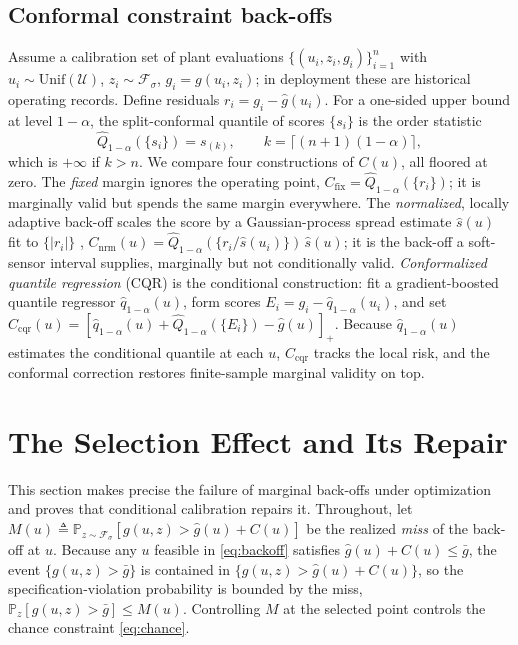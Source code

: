 \documentclass[journal]{IEEEtran}
\begin{document}
\subsection{Conformal constraint back-offs}
\label{sec:methods-backoffs}
Assume a calibration set of plant evaluations $\{(u_i,z_i,g_i)\}_{i=1}^n$ with
$u_i\sim\mathrm{Unif}(\mathcal U)$, $z_i\sim\mathcal F_\sigma$, $g_i=g(u_i,z_i)$; in deployment
these are historical operating records. Define residuals $r_i=g_i-\hat g(u_i)$. For a one-sided
upper bound at level $1-\alpha$, the split-conformal quantile of scores $\{s_i\}$ is the order
statistic
\begin{equation}
\widehat Q_{1-\alpha}(\{s_i\})=s_{(k)},\qquad k=\lceil(n+1)(1-\alpha)\rceil,
\label{eq:quantile}
\end{equation}
which is $+\infty$ if $k>n$. We compare four constructions of $C(u)$, all floored at zero. The
\emph{fixed} margin ignores the operating point, $C_{\mathrm{fix}}=\widehat Q_{1-\alpha}(\{r_i\})$;
it is marginally valid but spends the same margin everywhere. The \emph{normalized}, locally
adaptive back-off scales the score by a Gaussian-process spread estimate $\hat s(u)$ fit to
$\{|r_i|\}$ \cite{lei2018},
$C_{\mathrm{nrm}}(u)=\widehat Q_{1-\alpha}(\{r_i/\hat s(u_i)\})\,\hat s(u)$; it is the back-off a
soft-sensor interval supplies, marginally but not conditionally valid. \emph{Conformalized
quantile regression} (CQR) \cite{romano2019} is the conditional construction: fit a
gradient-boosted quantile regressor $\hat q_{1-\alpha}(u)$, form scores
$E_i=g_i-\hat q_{1-\alpha}(u_i)$, and set
$C_{\mathrm{cqr}}(u)=[\hat q_{1-\alpha}(u)+\widehat Q_{1-\alpha}(\{E_i\})-\hat g(u)]_+$. Because
$\hat q_{1-\alpha}(u)$ estimates the conditional quantile at each $u$, $C_{\mathrm{cqr}}$ tracks
the local risk, and the conformal correction restores finite-sample marginal validity on top.

\section{The Selection Effect and Its Repair}
\label{sec:theory}

This section makes precise the failure of marginal back-offs under optimization and proves that
conditional calibration repairs it. Throughout, let
$M(u)\triangleq\mathbb{P}_{z\sim\mathcal F_\sigma}[g(u,z)>\hat g(u)+C(u)]$ be the realized
\emph{miss} of the back-off at $u$. Because any $u$ feasible in \eqref{eq:backoff} satisfies
$\hat g(u)+C(u)\le\bar g$, the event $\{g(u,z)>\bar g\}$ is contained in
$\{g(u,z)>\hat g(u)+C(u)\}$, so the specification-violation probability is bounded by the miss,
$\mathbb P_z[g(u,z)>\bar g]\le M(u)$. Controlling $M$ at the selected point controls the chance
constraint \eqref{eq:chance}.
\end{document}
